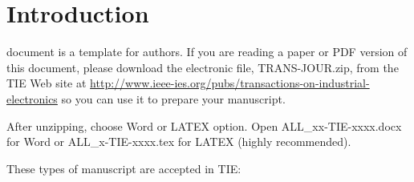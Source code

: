 
\section{Introduction}

 document is a template for authors. If you are reading a paper or PDF version of this document, please download the electronic file, TRANS-JOUR.zip, from the TIE Web site at \url{http://www.ieee-ies.org/pubs/transactions-on-industrial-electronics} so you can use it to prepare your manuscript.

After unzipping, choose Word or LATEX option. Open ALL\_xx-TIE-xxxx.docx for Word or ALL\_x-TIE-xxxx.tex for LATEX (highly recommended).

These types of manuscript are accepted in TIE: